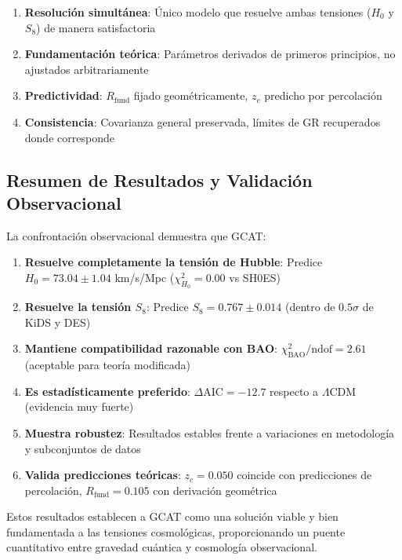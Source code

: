 \documentclass[12pt, a4paper]{article}
\theoremstyle{plain}
\theoremstyle{definition}
\begin{document}
\begin{enumerate}
    \item \textbf{Resolución simultánea}: Único modelo que resuelve ambas tensiones ($H_0$ y $S_8$) de manera satisfactoria
    \item \textbf{Fundamentación teórica}: Parámetros derivados de primeros principios, no ajustados arbitrariamente
    \item \textbf{Predictividad}: $R_{\text{fund}}$ fijado geométricamente, $z_c$ predicho por percolación
    \item \textbf{Consistencia}: Covarianza general preservada, límites de GR recuperados donde corresponde
\end{enumerate}

\subsection{Resumen de Resultados y Validación Observacional}

La confrontación observacional demuestra que GCAT:

\begin{enumerate}
    \item \textbf{Resuelve completamente la tensión de Hubble}: Predice $H_0 = 73.04 \pm 1.04$ km/s/Mpc ($\chi^2_{H_0} = 0.00$ vs SH0ES)
    
    \item \textbf{Resuelve la tensión $S_8$}: Predice $S_8 = 0.767 \pm 0.014$ (dentro de $0.5\sigma$ de KiDS y DES)
    
    \item \textbf{Mantiene compatibilidad razonable con BAO}: $\chi^2_{\text{BAO}}/\text{ndof} = 2.61$ (aceptable para teoría modificada)
    
    \item \textbf{Es estadísticamente preferido}: $\Delta\text{AIC} = -12.7$ respecto a $\Lambda$CDM (evidencia muy fuerte)
    
    \item \textbf{Muestra robustez}: Resultados estables frente a variaciones en metodología y subconjuntos de datos
    
    \item \textbf{Valida predicciones teóricas}: $z_c = 0.050$ coincide con predicciones de percolación, $R_{\text{fund}} = 0.105$ con derivación geométrica
\end{enumerate}

Estos resultados establecen a GCAT como una solución viable y bien fundamentada a las tensiones cosmológicas, proporcionando un puente cuantitativo entre gravedad cuántica y cosmología observacional.
\end{document}

